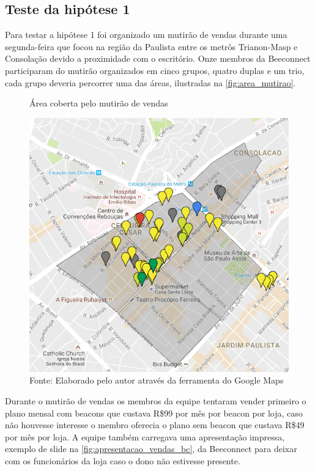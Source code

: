 \subsection{Teste da hipótese 1}
\label{cha:teste_1}
Para testar a hipótese 1 foi organizado um mutirão de vendas durante uma segunda-feira que focou na região da Paulista entre os metrôs Trianon-Masp e Consolação devido a proximidade com o escritório. Onze membros da Beeconnect participaram do mutirão organizados em cinco grupos, quatro duplas e um trio, cada grupo deveria percorrer uma das áreas, ilustradas na \autoref{fig:area_mutirao}.

\begin{figure}[H]
\caption{Área coberta pelo mutirão de vendas}
\centerline{\includegraphics[scale=0.25]{img/area_mutirao}}
\label{fig:area_mutirao}
\caption* {Fonte: Elaborado pelo autor através da ferramenta do Google Maps}
\end{figure}

Durante o mutirão de vendas os membros da equipe tentaram vender primeiro o plano mensal com beacons que custava R\$99 por mês por beacon por loja, caso não houvesse interesse o membro oferecia o plano sem beacon que custava R\$49 por mês por loja. A equipe também carregava uma apresentação impressa, exemplo de slide na \autoref{fig:apresentacao_vendas_bc}, da Beeconnect para deixar com os funcionários da loja caso o dono não estivesse presente.

